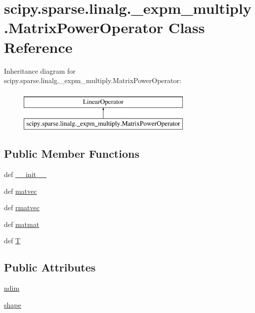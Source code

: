\hypertarget{classscipy_1_1sparse_1_1linalg_1_1__expm__multiply_1_1MatrixPowerOperator}{}\section{scipy.\+sparse.\+linalg.\+\_\+expm\+\_\+multiply.\+Matrix\+Power\+Operator Class Reference}
\label{classscipy_1_1sparse_1_1linalg_1_1__expm__multiply_1_1MatrixPowerOperator}
Inheritance diagram for scipy.\+sparse.\+linalg.\+\_\+expm\+\_\+multiply.\+Matrix\+Power\+Operator\+:\begin{figure}[H]
\begin{center}
\leavevmode
\includegraphics[height=2.000000cm]{classscipy_1_1sparse_1_1linalg_1_1__expm__multiply_1_1MatrixPowerOperator}
\end{center}
\end{figure}
\subsection*{Public Member Functions}
\begin{DoxyCompactItemize}
\item 
def \hyperlink{classscipy_1_1sparse_1_1linalg_1_1__expm__multiply_1_1MatrixPowerOperator_a2c08cdc5e8901959d6ae80eb2fced29e}{\+\_\+\+\_\+init\+\_\+\+\_\+}
\item 
def \hyperlink{classscipy_1_1sparse_1_1linalg_1_1__expm__multiply_1_1MatrixPowerOperator_a3581f1f049f61ade93178efaa92587ee}{matvec}
\item 
def \hyperlink{classscipy_1_1sparse_1_1linalg_1_1__expm__multiply_1_1MatrixPowerOperator_a7c874057df3847b4771bfde3f8e49f17}{rmatvec}
\item 
def \hyperlink{classscipy_1_1sparse_1_1linalg_1_1__expm__multiply_1_1MatrixPowerOperator_af38b573baa5af1e4c79dd5e30df5a6fa}{matmat}
\item 
def \hyperlink{classscipy_1_1sparse_1_1linalg_1_1__expm__multiply_1_1MatrixPowerOperator_a9dcd10b23722af9e2d349aa1d3dd6449}{T}
\end{DoxyCompactItemize}
\subsection*{Public Attributes}
\begin{DoxyCompactItemize}
\item 
\hyperlink{classscipy_1_1sparse_1_1linalg_1_1__expm__multiply_1_1MatrixPowerOperator_a60b71ba6ecb041ac1834c09e3f9cd67f}{ndim}
\item 
\hyperlink{classscipy_1_1sparse_1_1linalg_1_1__expm__multiply_1_1MatrixPowerOperator_a1a36cd5153fc69c2db9effe66a44ee63}{shape}
\end{DoxyCompactItemize}


